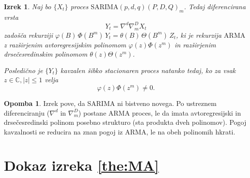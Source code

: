 \documentclass[11pt]{amsart}
\providecommand{\abs}[1]{\left\lvert #1 \right\rvert}
\theoremstyle{definition}
\newtheorem{opomba}[definicija]{Opomba}
\theoremstyle{plain}
\newtheorem{izrek}[definicija]{Izrek}
\begin{document}
\begin{izrek}
    Naj bo $\{X_t\}$ proces $\mathrm{SARIMA}(p,d,q)(P,D,Q)_m$. Tedaj diferencirana vrsta 
    \[
        Y_t = \nabla^d \nabla_m^D X_t
    \]
    zadošča rekurziji $\varphi(B)\,\Phi(B^m)\,Y_t = \theta(B)\,\Theta(B^m)\,Z_t$, ki je 
    rekurzija $\mathrm{ARMA}$ z razširjenim avtoregresijskim polinomom $\varphi(z)\Phi(z^m)$ 
    in razširjenim drsečesredinskim polinomom $\theta(z)\Theta(z^m)$.
    
    Posledično je $\{Y_t\}$ kavzalen šibko stacionaren proces natanko tedaj, ko za vsak
    $z \in \mathbb{C}, \abs{z} \leq 1$ velja 
    \[
        \varphi(z)\Phi(z^m) \neq 0.
    \]
\end{izrek}

\begin{opomba}
    Izrek pove, da SARIMA ni bistveno novega. Po ustreznem diferenciranju ($\nabla^d$ in 
    $\nabla_m^D$) postane ARMA proces, le da imata avtoregresijski in drsečesredinski 
    polinom posebno strukturo (sta produkta dveh polinomov). Pogoj kavzalnosti se reducira na 
    znan pogoj iz $\mathrm{ARMA}$, le na obeh polinomih hkrati.
\end{opomba}

\newpage

\appendix

\section{Dokaz izreka \ref{the:MA}}\label{sec:dokazi}
\end{document}
